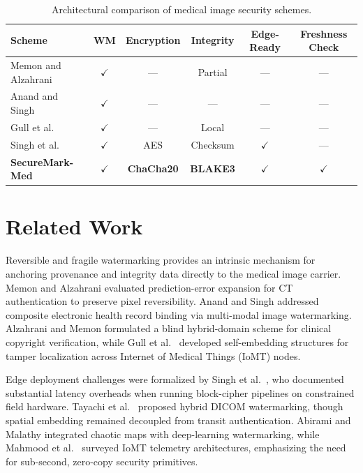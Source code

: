 \documentclass[runningheads]{llncs}
\begin{document}
\begin{table}[t]
\centering
\caption{Architectural comparison of medical image security schemes.}
\label{tab:comparison}
\small
\begin{tabular}{lccccc}
\hline
Scheme & WM & Encryption & Integrity & Edge-Ready & Freshness Check \\
\hline
Memon and Alzahrani \cite{memon2020prediction} & $\checkmark$ & --- & Partial & --- & --- \\
Anand and Singh \cite{anand2021health}     & $\checkmark$ & --- & ---      & --- & --- \\
Gull et al.\ \cite{gull2021self}         & $\checkmark$ & --- & Local    & --- & --- \\
Singh et al.\ \cite{singh2023robust}        & $\checkmark$ & AES & Checksum & $\checkmark$ & --- \\
\textbf{SecureMark-Med} & \textbf{$\checkmark$} & \textbf{ChaCha20} & \textbf{BLAKE3} & \textbf{$\checkmark$} & \textbf{$\checkmark$} \\
\hline
\end{tabular}
\end{table}

\section{Related Work}

Reversible and fragile watermarking provides an intrinsic mechanism for anchoring provenance and integrity data directly to the medical image carrier. Memon and Alzahrani \cite{memon2020prediction} evaluated prediction-error expansion for CT authentication to preserve pixel reversibility. Anand and Singh \cite{anand2021health} addressed composite electronic health record binding via multi-modal image watermarking. Alzahrani and Memon \cite{alzahrani2021blind} formulated a blind hybrid-domain scheme for clinical copyright verification, while Gull et al.\ \cite{gull2021self} developed self-embedding structures for tamper localization across Internet of Medical Things (IoMT) nodes.

Edge deployment challenges were formalized by Singh et al.\ \cite{singh2023robust}, who documented substantial latency overheads when running block-cipher pipelines on constrained field hardware. Tayachi et al.\ \cite{tayachi2023hybrid} proposed hybrid DICOM watermarking, though spatial embedding remained decoupled from transit authentication. Abirami and Malathy \cite{abirami2024secured} integrated chaotic maps with deep-learning watermarking, while Mahmood et al.\ \cite{mahmood2025secure} surveyed IoMT telemetry architectures, emphasizing the need for sub-second, zero-copy security primitives.
\end{document}
